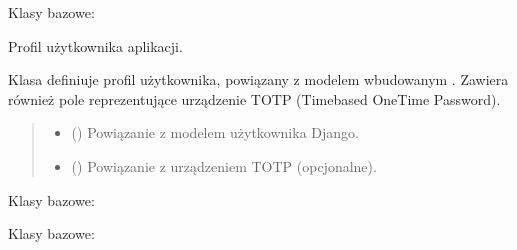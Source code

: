 \documentclass[letterpaper,10pt,polish]{sphinxmanual}
\begin{document}
\begin{fulllineitems}
\label{\detokenize{mainApp:mainApp.models.UserProfile}}
\pysigstartsignatures
{}
\pysigstopsignatures
\sphinxAtStartPar
Klasy bazowe: 

\sphinxAtStartPar
Profil użytkownika aplikacji.

\sphinxAtStartPar
Klasa  definiuje profil użytkownika, powiązany z modelem wbudowanym .
Zawiera również pole  reprezentujące urządzenie TOTP (Time\sphinxhyphen{}based One\sphinxhyphen{}Time Password).
\begin{quote}\begin{description}
\begin{itemize}
\item {} 
\sphinxAtStartPar
{} () \textendash{} Powiązanie z modelem użytkownika Django.

\item {} 
\sphinxAtStartPar
{} () \textendash{} Powiązanie z urządzeniem TOTP (opcjonalne).

\end{itemize}

\end{description}\end{quote}

\begin{fulllineitems}
\label{\detokenize{mainApp:mainApp.models.UserProfile.DoesNotExist}}
\pysigstartsignatures
{}
\pysigstopsignatures
\sphinxAtStartPar
Klasy bazowe: 

\end{fulllineitems}


\begin{fulllineitems}
\label{\detokenize{mainApp:mainApp.models.UserProfile.MultipleObjectsReturned}}
\pysigstartsignatures
{}
\pysigstopsignatures
\sphinxAtStartPar
Klasy bazowe: 


\end{fulllineitems}
\end{fulllineitems}
\end{document}
